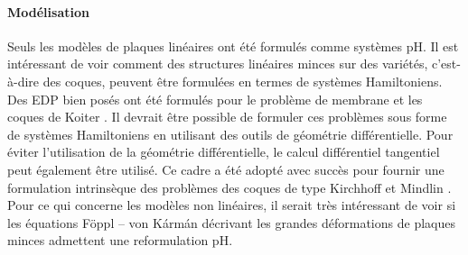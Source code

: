 \paragraph{Modélisation}
Seuls les modèles de plaques linéaires ont été formulés comme systèmes pH. Il est intéressant de voir comment des structures linéaires minces sur des variétés, c'est-à-dire des coques, peuvent être formulées en termes de systèmes Hamiltoniens. Des EDP bien posés ont été formulés pour le problème de membrane et les coques de Koiter \cite{ciarlet2000shells}. Il devrait être possible de formuler ces problèmes sous forme de systèmes Hamiltoniens en utilisant des outils de géométrie différentielle. Pour éviter l'utilisation de la géométrie différentielle, le calcul différentiel tangentiel \cite{delfour2011shapes} peut également être utilisé. Ce cadre a été adopté avec succès pour fournir une formulation intrinsèque des problèmes des coques de type Kirchhoff \cite{schollhammer2019kirchhoff} et Mindlin \cite{schollhammer2019reissner}. \\
Pour ce qui concerne les modèles non linéaires, il serait très intéressant de voir si les équations F\"oppl – von K\'arm\'an décrivant les grandes déformations de plaques minces \cite{bilbao2015conservative} admettent une reformulation pH. \\


